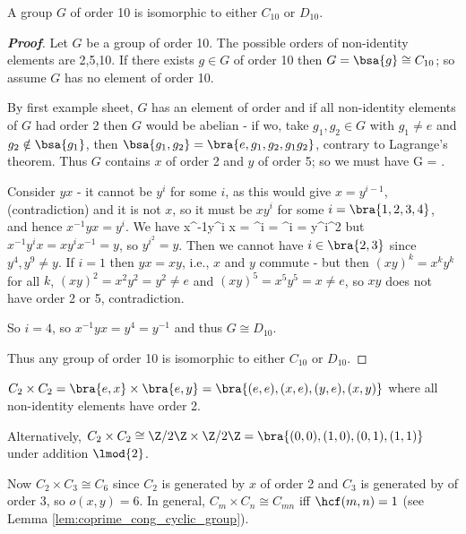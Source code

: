 \begin{lemma}\label{lem:group_order_10}
A group $G$ of order 10 is isomorphic to either $C_{10}$ or $D_{10}$.
\end{lemma}

\begin{proof}[\bf Proof]
Let $G$ be a group of order 10. The possible orders of non-identity elements are 2,5,10. If there exists $g\in G$ of order 10 then $G = \bsa{g} \cong C_{10}$; so assume $G$ has no element of order 10.

By first example sheet, $G$ has an element of order and if all non-identity elements of $G$ had order 2 then $G$ would be abelian - if wo, take $g_1,g_2\in G$ with $g_1\neq e$ and $g_2 \notin \bsa{g_1}$, then $\bsa{g_1,g_2} = \bra{e,g_1,g_2,g_1g_2}$, contrary to Lagrange's theorem. Thus $G$ contains $x$ of order 2 and $y$ of order 5; so we must have
\be
G = .
\ee

Consider $yx$ - it cannot be $y^i$ for some $i$, as this would give $x = y^{i-1}$, (contradiction) and it is not $x$, so it must be $xy^i$ for some $i = \bra{1,2,3,4}$, and hence $x^{-1}yx = y^i$. We have
\be
x^{-1}y^i x = ^i = ^i = y^{i^2}
\ee
but $x^{-1}y^ix = xy^i x^{-1} = y$, so $y^{i^2} = y$. Then we cannot have $i\in \bra{2,3}$ since $y^4,y^9 \neq y$. If $i =1$ then $yx = xy$, i.e., $x$ and $y$ commute - but then $(xy)^k = x^ky^k $ for all $k$, $(xy)^2 = x^2 y^2 = y^2 \neq e$ and $(xy)^5 = x^5 y^5 = x \neq e$, so $xy$ does not have order 2 or 5, contradiction.

So $i=4$, so $x^{-1}yx = y^4 = y^{-1}$ and thus $G \cong D_{10}$.

Thus any group of order 10 is isomorphic to either $C_{10}$ or $D_{10}$.
\end{proof}

\begin{example}
$C_2 \times C_2 = \bra{e,x}\times\bra{e,y} = \bra{(e,e),(x,e),(y,e),(x,y)}$ where all non-identity elements have order 2.

Alternatively, $C_2\times C_2 \cong \Z/2\Z\times \Z/2\Z = \bra{(0,0),(1,0),(0,1),(1,1)}$ under addition $\lmod{2}$.

Now $C_2\times C_3 \cong C_6$ since $C_2$ is generated by $x$ of order 2 and $C_3$ is generated by of order 3, so $o(x,y) = 6$. In general, $C_m\times C_n \cong C_{mn}$ iff $\hcf(m,n) =1$ (see Lemma \ref{lem:coprime_cong_cyclic_group}).
\end{example}



